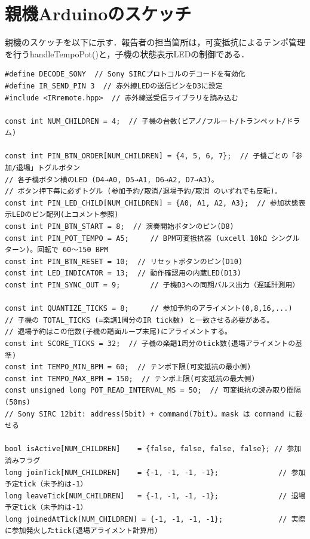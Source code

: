\documentclass[uplatex,dvipdfmx]{jlreq}
\begin{document}
\clearpage
\appendix
\renewcommand{\thefigure}{A.\arabic{figure}} %
\renewcommand{\thetable}{A.\arabic{table}}   %
\renewcommand{\theequation}{\Alph{section}.\arabic{equation}} %

\section{親機Arduinoのスケッチ}
\label{sec:code-oya}

親機のスケッチを以下に示す．報告者の担当箇所は，可変抵抗によるテンポ管理を行うhandleTempoPot()と，子機の状態表示LEDの制御である．

\begin{lstlisting}
#define DECODE_SONY  // Sony SIRCプロトコルのデコードを有効化
#define IR_SEND_PIN 3  // 赤外線LEDの送信ピンをD3に設定
#include <IRremote.hpp>  // 赤外線送受信ライブラリを読み込む

const int NUM_CHILDREN = 4;  // 子機の台数(ピアノ/フルート/トランペット/ドラム)

const int PIN_BTN_ORDER[NUM_CHILDREN] = {4, 5, 6, 7};  // 子機ごとの「参加/退場」トグルボタン
// 各子機ボタン横のLED (D4→A0, D5→A1, D6→A2, D7→A3)。
// ボタン押下毎に必ずトグル (参加予約/取消/退場予約/取消 のいずれでも反転)。
const int PIN_LED_CHILD[NUM_CHILDREN] = {A0, A1, A2, A3};  // 参加状態表示LEDのピン配列(上コメント参照)
const int PIN_BTN_START = 8;  // 演奏開始ボタンのピン(D8)
const int PIN_POT_TEMPO = A5;     // BPM可変抵抗器 (uxcell 10kΩ シングルターン)。回転で 60〜150 BPM
const int PIN_BTN_RESET = 10;  // リセットボタンのピン(D10)
const int LED_INDICATOR = 13;  // 動作確認用の内蔵LED(D13)
const int PIN_SYNC_OUT = 9;       // 子機D3への同期パルス出力（遅延計測用）

const int QUANTIZE_TICKS = 8;     // 参加予約のアライメント(0,8,16,...)
// 子機の TOTAL_TICKS (=楽譜1周分のIR tick数) と一致させる必要がある。
// 退場予約はこの倍数(子機の譜面ループ末尾)にアライメントする。
const int SCORE_TICKS = 32;  // 子機の楽譜1周分のtick数(退場アライメントの基準)
const int TEMPO_MIN_BPM = 60;  // テンポ下限(可変抵抗の最小側)
const int TEMPO_MAX_BPM = 150;  // テンポ上限(可変抵抗の最大側)
const unsigned long POT_READ_INTERVAL_MS = 50;  // 可変抵抗の読み取り間隔(50ms)
// Sony SIRC 12bit: address(5bit) + command(7bit)。mask は command に載せる

bool isActive[NUM_CHILDREN]    = {false, false, false, false}; // 参加済みフラグ
long joinTick[NUM_CHILDREN]    = {-1, -1, -1, -1};              // 参加予定tick（未予約は-1）
long leaveTick[NUM_CHILDREN]   = {-1, -1, -1, -1};              // 退場予定tick（未予約は-1）
long joinedAtTick[NUM_CHILDREN] = {-1, -1, -1, -1};             // 実際に参加発火したtick(退場アライメント計算用)


\end{lstlisting}
\end{document}
